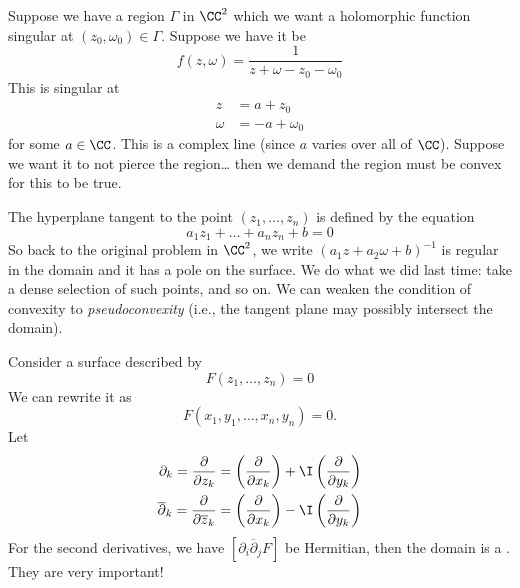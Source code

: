 
Suppose we have a region $\Gamma$ in $\CC^{2}$ which we want a holomorphic
function singular at $(z_{0},\omega_{0})\in\Gamma$. Suppose we
have it be
\begin{equation}
f(z,\omega)=\frac{1}{z+\omega-z_{0}-\omega_{0}}
\end{equation}
This is singular at
\begin{equation}
\begin{split}
z &= a + z_{0}\\
\omega &=-a+\omega_{0}
\end{split}
\end{equation}
for some $a\in\CC$. This is a complex line (since $a$ varies over
all of $\CC$). Suppose we want it to not pierce the region\dots
then we demand  the region must be convex for this to be true.

The hyperplane tangent to the point $(z_{1},\dots,z_{n})$ is
defined by the equation
\begin{equation}
a_{1}z_{1}+\dots+a_{n}z_{n}+b=0
\end{equation}
So back to the original problem in $\CC^{2}$, we write
$(a_{1}z+a_{2}\omega+b)^{-1}$ is regular in the domain and it has
a pole on the surface. We do what we did last time: take a dense
selection of such points, and so on. We can weaken the condition
of convexity to \emph{pseudoconvexity} (i.e., the tangent plane
may possibly intersect the domain).

Consider a surface described by
\begin{equation}
F(z_{1},\dots,z_{n})=0
\end{equation}
We can rewrite it as
\begin{equation}
F(x_{1},y_{1},\dots,x_{n},y_{n})=0.
\end{equation}
Let
\begin{equation}
\begin{split}
\partial_{k}=\frac{\partial}{\partial z_{k}}&=\left(\frac{\partial}{\partial x_{k}}\right)
+\I\left(\frac{\partial}{\partial y_{k}}\right)\\
\overline{\partial}_{k}=\frac{\partial}{\partial \overline{z}_{k}}&=\left(\frac{\partial}{\partial x_{k}}\right)
-\I\left(\frac{\partial}{\partial y_{k}}\right)
\end{split}
\end{equation}
For the second derivatives, we have
$[\partial_{i}\overline{\partial}_{j}F]$ be Hermitian, then the
domain is a . They are very important!

